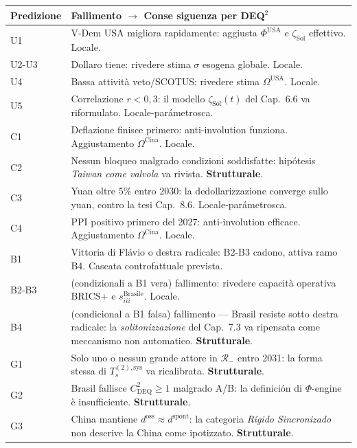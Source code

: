 {\def\LTcaptype{none} %
{\small\begin{longtable}[]{@{}
  >{\raggedright\arraybackslash}p{}
  >{\raggedright\arraybackslash}p{}@{}}
\toprule\noalign{}
\begin{minipage}[b]{\linewidth}\raggedright
Predizione
\end{minipage} & \begin{minipage}[b]{\linewidth}\raggedright
Fallimento $\to$ Conse siguenza per DEQ$^2$
\end{minipage} \\
\midrule\noalign{}
\endhead
\bottomrule\noalign{}
\endlastfoot
U1 & V-Dem USA migliora rapidamente: aggiusta \(\Phi^{\text{USA}}\) e
\(\zeta_{\text{Sol}}\) effettivo. Locale. \\
U2-U3 & Dollaro tiene: rivedere stima \(\sigma\) esogena globale.
Locale. \\
U4 & Bassa attività veto/SCOTUS: rivedere stima \(\Omega^{\text{USA}}\).
Locale. \\
U5 & Correlazione \(r < 0{,}3\): il modello \(\zeta_{\text{Sol}}(t)\)
del Cap.~6.6 va riformulato. Locale-parámetrosca. \\
C1 & Deflazione finisce primero: anti-involution funziona. Aggiustamento
\(\Omega^{\text{Cina}}\). Locale. \\
C2 & Nessun bloqueo malgrado condizioni soddisfatte: hipótesis
\emph{Taiwan come valvola} va rivista. \textbf{Strutturale}. \\
C3 & Yuan oltre \(5\%\) entro 2030: la dedollarizzazione converge sullo
yuan, contro la tesi Cap.~8.6. Locale-parámetrosca. \\
C4 & PPI positivo primero del 2027: anti-involution efficace.
Aggiustamento \(\Omega^{\text{Cina}}\). Locale. \\
B1 & Vittoria di Flávio o destra radicale: B2-B3 cadono, attiva ramo B4.
Cascata controfattuale prevista. \\
B2-B3 & (condizionali a B1 vera) fallimento: rivedere capacità operativa
BRICS+ e \(s_{iii}^{\text{Brasile}}\). Locale. \\
B4 & (condicional a B1 falsa) fallimento --- Brasil resiste sotto
destra radicale: la \emph{solitonizzazione} del Cap.~7.3 va ripensata
come meccanismo non automatico. \textbf{Strutturale}. \\
G1 & Solo uno o nessun grande attore in \(\mathcal{R}_-\) entro 2031: la
forma stessa di \(T_s^{(2),\text{sys}}\) va ricalibrata.
\textbf{Strutturale}. \\
G2 & Brasil fallisce \(C_{\text{DEQ}}^2 \geq 1\) malgrado A/B: la
definición di \(\Phi\)-engine è insufficiente. \textbf{Strutturale}. \\
G3 & China mantiene \(d^{\text{oss}} \approx d^{\text{spont}}\): la
categoria \emph{Rígido Sincronizado} non descrive la China come
ipotizzato. \textbf{Strutturale}. \\
\end{longtable}}
}

